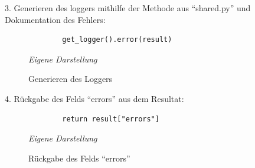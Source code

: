 	3. Generieren des loggers mithilfe der Methode aus ``shared.py'' und Dokumentation des Fehlers:\newline
		\begin{figure}[H]
		\centering
		\begin{minipage}[t]{.7\textwidth} %
		\caption{Generieren des Loggers} %
		\begin{verbatim}
		get_logger().error(result)
		\end{verbatim}
		
		\textit{Eigene Darstellung} %
		\label{fig:loggerGenerierung}
		\end{minipage}
		\end{figure}
	4. Rückgabe des Felds ``errors'' aus dem Resultat:\newline
		\begin{figure}[H]
		\centering
		\begin{minipage}[t]{.7\textwidth} %
		\caption{Rückgabe des Felds ``errors''} %
		\begin{verbatim}
		return result["errors"]
		\end{verbatim}
		
		\textit{Eigene Darstellung} %
		\label{fig:errorFeldRückgabe}
		\end{minipage}
		\end{figure}
